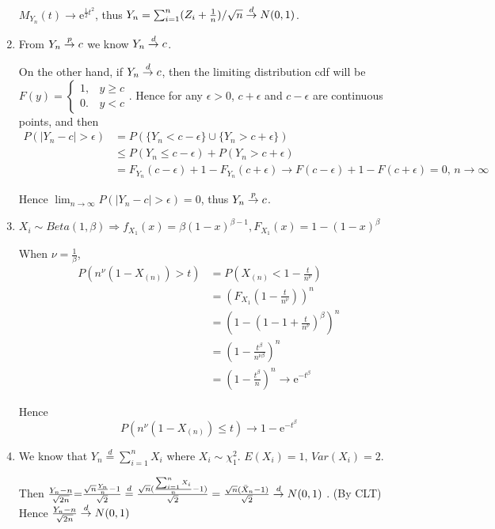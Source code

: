 \documentclass{article}
\begin{document}
\begin{enumerate}[leftmargin = 0 em, label = \arabic*., font = \bfseries]
	$M_{Y_n}(t) \to \mathrm{e}^{\frac{1}{2}t^2}$, thus $Y_n = \sum_{i=1}^n (Z_i + \frac{1}{n})/{\sqrt{n}} \overset{d}{\to} N(0,1)$.
	
	
	\item 
	From $Y_n \overset{p}{\to} c$ we know $Y_n \overset{d}{\to} c$. 

	On the other hand, if $Y_n \overset{d}{\to} c$, then the limiting distribution cdf will be $F(y) = \begin{cases}
		1, & y \geq c\\
		0. & y < c
	\end{cases} $. Hence for any $\epsilon >0$, $c+\epsilon$ and $c - \epsilon$ are continuous points, and then
	\begin{align*}
	P(|Y_n - c|> \epsilon) & = P(\{Y_n < c - \epsilon\} \cup \{ Y_n >  c+ \epsilon\})\\
	& \leq P(Y_n \leq c- \epsilon) + P(Y_n > c+\epsilon)\\
	& = F_{Y_n}(c-\epsilon) + 1-  F_{Y_n}(c + \epsilon) \to F(c- \epsilon) + 1- F(c + \epsilon) = 0, \, n\to \infty
	\end{align*}

	Hence $\lim_{n\to \infty} P(|Y_n - c| > \epsilon) = 0$, thus $Y_n \overset{p}{\to} c$.
	
	
	
	\item 
	$X_i \sim Beta(1,\beta) \Rightarrow f_{X_1} (x) = \beta (1 - x)^{\beta - 1}, F_{X_1}(x) = 1 - (1 - x)^\beta$

	When $\nu = \frac{1}{\beta}$, 
	\begin{align*}
	P(n^\nu (1 - X_{(n)}) > t) &= P(X_{(n)} < 1 - \frac{t}{n^\nu})\\
	& = (F_{X_1} (1 - \frac{t}{n^\nu}))^n\\
	& = (1 - (1 - 1 + \frac{t}{n^\nu})^\beta)^n\\
	& = (1 - \frac{t^\beta}{n^{\nu \beta}})^n\\
	& = (1 - \frac{t^\beta}{n})^n \to \mathrm{e}^{-t^\beta} 
	\end{align*}

	Hence
	\[P(n^\nu (1 - X_{(n)}) \leq t) \to 1 - \mathrm{e}^{-t^\beta}\]
	
	
	\item 
	We know that $Y_n \overset{d}{=} \sum_{i = 1}^n X_i$ where $X_i \sim \chi_1^2$. $E(X_i) = 1,\, Var(X_i) = 2$.

	Then $\frac{Y_n - n}{\sqrt{2n}} {=} \frac{\sqrt{n} \frac{Y_n}{n} - 1}{\sqrt{2}} \overset{d}{=} \frac{\sqrt{n} (\frac{\sum_{i=1}^n X_i}{n} - 1)}{\sqrt{2}} = \frac{\sqrt{n} (\bar{X}_n - 1)}{\sqrt{2}} \overset{d}{\to} N(0,1)$ . (By CLT) Hence $\frac{Y_n - n}{\sqrt{2n}} \overset{d}{\to} N(0,1)$



\end{enumerate}
\end{document}
